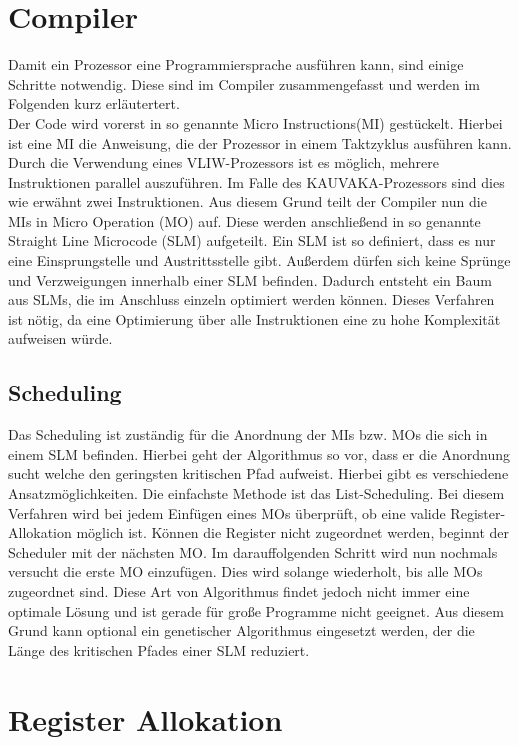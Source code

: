 \section{Compiler}
Damit ein Prozessor eine Programmiersprache ausführen kann, sind einige Schritte notwendig. Diese sind im Compiler zusammengefasst und werden im Folgenden kurz erläutertert.\\
Der Code wird vorerst in so genannte \glqq Micro Instructions\grqq(MI) gestückelt. Hierbei ist eine MI die Anweisung, die der Prozessor in einem Taktzyklus ausführen kann. Durch die Verwendung eines VLIW-Prozessors ist es möglich, mehrere Instruktionen parallel auszuführen. Im Falle des KAUVAKA-Prozessors sind dies wie erwähnt zwei Instruktionen. Aus diesem Grund teilt der Compiler nun die MIs in \glqq Micro Operation \grqq (MO) auf. Diese werden anschließend in so genannte \glqq Straight Line Microcode\grqq{} (SLM) aufgeteilt. Ein SLM ist so definiert, dass es nur eine Einsprungstelle und Austrittsstelle gibt. Außerdem dürfen sich keine Sprünge und Verzweigungen innerhalb einer SLM befinden.  Dadurch entsteht ein Baum aus SLMs, die im Anschluss einzeln optimiert werden können. Dieses Verfahren ist nötig, da eine Optimierung über alle Instruktionen eine zu hohe Komplexität aufweisen würde. \cite{landskov1980local}
\subsection{Scheduling}
\label{sec:scheduling}
Das Scheduling ist zuständig für die Anordnung der MIs bzw. MOs die sich in einem SLM befinden. Hierbei geht der Algorithmus so vor, dass er die Anordnung sucht welche den geringsten kritischen Pfad aufweist. Hierbei gibt es verschiedene Ansatzmöglichkeiten. Die einfachste Methode ist das List-Scheduling. Bei diesem Verfahren wird bei jedem Einfügen eines MOs überprüft, ob eine valide Register-Allokation möglich ist. Können die Register nicht zugeordnet werden, beginnt der Scheduler mit der nächsten MO. Im darauffolgenden Schritt wird nun nochmals versucht die erste MO einzufügen. Dies wird solange wiederholt, bis alle MOs zugeordnet sind.\cite{landskov1980local}
Diese Art von Algorithmus findet jedoch nicht immer eine optimale Lösung und ist gerade für große Programme nicht geeignet. Aus diesem Grund kann optional ein genetischer Algorithmus eingesetzt werden, der die Länge des kritischen Pfades einer SLM reduziert.


\section{Register Allokation}
\label{sec:register allok}
